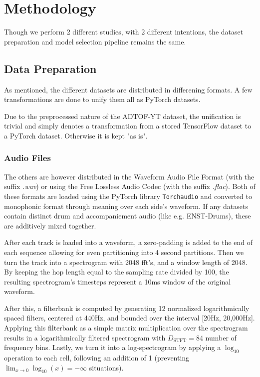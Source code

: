 \chapter{Methodology}

Though we perform 2 different studies, with 2 different intentions, the dataset preparation and model selection pipeline remains the same. 

\section{Data Preparation}

As mentioned, the different datasets are distributed in differening formats. A few transformations are done to unify them all as PyTorch datasets.

Due to the preprocessed nature of the ADTOF-YT dataset, the unification is trivial and simply denotes a transformation from a stored TensorFlow dataset to a PyTorch dataset. Otherwise it is kept "as is".

\subsection{Audio Files}

The others are however distributed in the Waveform Audio File Format (with the suffix \textit{.wav}) or using the Free Lossless Audio Codec (with the suffix \textit{.flac}). Both of these formats are loaded using the PyTorch library \texttt{Torchaudio} and converted to monophonic format through meaning over each side's waveform. If any datasets contain distinct drum and accompaniement audio (like e.g. ENST-Drums), these are additively mixed together.

After each track is loaded into a waveform, a zero-padding is added to the end of each sequence allowing for even partitioning into 4 second partitions. Then we turn the track into a spectrogram with 2048 fft's, and a window length of 2048. By keeping the hop length equal to the sampling rate divided by 100, the resulting spectrogram's timesteps represent a 10ms window of the original waveform.

After this, a filterbank is computed by generating 12 normalized logarithmically spaced filters, centered at 440Hz, and bounded over the interval [20Hz, 20,000Hz]. Applying this filterbank as a simple matrix multiplication over the spectrogram results in a logarithmically filtered spectrogram with $D_\text{STFT} = 84$ number of frequency bins. Lastly, we turn it into a log-spectrogram by applying a $\log_{10}$ operation to each cell, following an addition of 1 (preventing $\lim_{x \to 0}\log_{10}(x) = -\infty$ situations).

